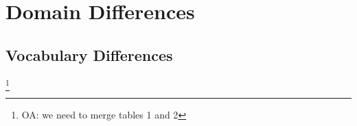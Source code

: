 \documentclass[11pt,a4paper,table]{article}
\newcommand{\oa}[1]{\footnote{\color{red}OA: #1}}
\begin{document}
\section{Domain Differences}

\subsection{Vocabulary Differences}

    \oa{we need to merge tables 1 and 2}

    \begin{table}[]
        \caption{Jensen-Shannon divergence and Variational distance between word distribution in all onion drug sites, legal and illegal onion drug sites, and eBay sites. \label{ta:domain}}
    \end{table}
\end{document}
